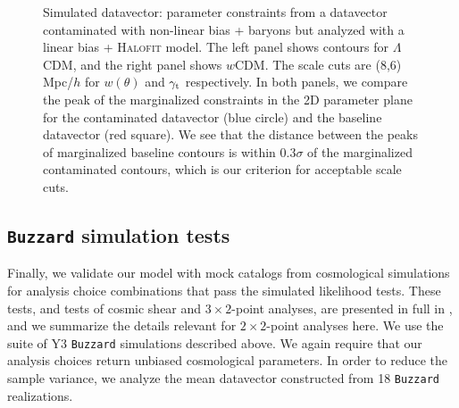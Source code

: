 \documentclass[aps, prd,twocolumn,superscriptaddress,nofootinbib,preprintnumbers]{revtex4-1}
\newcommand{\lcdm}{$\Lambda$CDM}
\newcommand{\wcdm}{$w$CDM}
\newcommand{\mice}{\texttt{MICE} }
\newcommand{\buzzard}{\texttt{Buzzard} }
\newcommand{\blue}[1]{\textcolor{blue}{#1}}
\begin{document}
\begin{figure}
\centering
{}
\hfill
{}
    \caption[]{Simulated datavector: parameter constraints from a datavector contaminated with non-linear bias + baryons but analyzed with a linear bias + \textsc{Halofit} model. The left panel shows contours for \lcdm, and the right panel shows \wcdm. The scale cuts are (8,6) Mpc/$h$ for $w(\theta)$ and $\gamma_{\rm t}$ respectively. In both panels, we compare the peak of the marginalized constraints in the 2D  parameter plane for the contaminated datavector (blue circle) and the baseline datavector  (red square). We see that the distance between the peaks of marginalized baseline contours is within 0.3$\sigma$ of the marginalized contaminated contours, which is our criterion for acceptable scale cuts. }
\label{fig:sim_lin}    
\end{figure}



\subsection{\buzzard simulation tests}
\label{sec:sims}
Finally, we validate our model with mock catalogs from cosmological simulations for analysis choice combinations that pass the simulated likelihood tests. These tests, and tests of cosmic shear and $3\times2$-point analyses, are presented in full in \citet*{y3-simvalidation}, and we summarize the details relevant for $2\times2$-point analyses here. We use the suite of Y3 \buzzard simulations described above. We again require that our analysis choices return unbiased cosmological parameters. In order to reduce the sample variance, we analyze the mean datavector constructed from 18 \buzzard realizations. 
\end{document}
